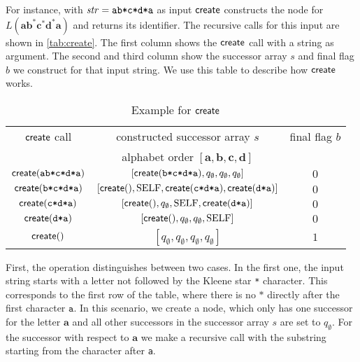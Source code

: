 For instance, with $\mathit{str} = \texttt{ab*c*d*a}$ as input $\operatorname{\textsf{create}}$ constructs the node for $L(\bm{ab^{*}c^{*}d^{*}a})$ and returns its identifier. The recursive calls for this input are shown in \autoref{tab:create}. The first column shows the $\operatorname{\textsf{create}}$ call with a string as argument. The second and third column show the successor array $s$ and final flag $b$ we construct for that input string. We use this table to describe how $\operatorname{\textsf{create}}$ works. 

\begin{table}[H]
\centering
\caption{Example for $\operatorname{\textsf{create}}$}\label{tab:create}
\begin{tabular}[t]{ccc}
\toprule
$\operatorname{\textsf{create}}$ call & constructed successor array $s$ & final flag $b$ \\  & alphabet order $[\bm{a},\bm{b},\bm{c},\bm{d}]$ & \\
\midrule
$\operatorname{\textsf{create}}(\texttt{ab*c*d*a})$&$[\operatorname{\textsf{create}}(\texttt{b*c*d*a}),q_{\emptyset},q_{\emptyset}, q_{\emptyset}]$&$0$\\
$\operatorname{\textsf{create}}(\texttt{b*c*d*a})$&$[\operatorname{\textsf{create}}(),\mathrm{SELF},\operatorname{\textsf{create}}(\texttt{c*d*a}), \operatorname{\textsf{create}}(\texttt{d*a})]$&$0$\\
$\operatorname{\textsf{create}}(\texttt{c*d*a})$&$[\operatorname{\textsf{create}}(),q_{\emptyset},\mathrm{SELF}, \operatorname{\textsf{create}}(\texttt{d*a})]$&$0$\\
$\operatorname{\textsf{create}}(\texttt{d*a})$&$[\operatorname{\textsf{create}}(),q_{\emptyset},q_{\emptyset}, \mathrm{SELF}]$&$0$\\
$\operatorname{\textsf{create}}()$&$[q_{\emptyset},q_{\emptyset},q_{\emptyset},q_{\emptyset}]$&$1$\\
\bottomrule
\end{tabular}
\end{table}


First, the operation distinguishes between two cases. 
In the first one, the input string starts with a letter not followed by the Kleene star \texttt{*} character. This corresponds to the first row of the table, where there is no $\texttt{*}$ directly after the first character $\texttt{a}$. In this scenario, we create a node, which only has one successor for the letter $\bm{a}$ and all other successors in the successor array $s$ are set to $q_{\emptyset}$. For the successor with respect to $\bm{a}$ we make a recursive call with the substring starting from the character after \texttt{a}.

